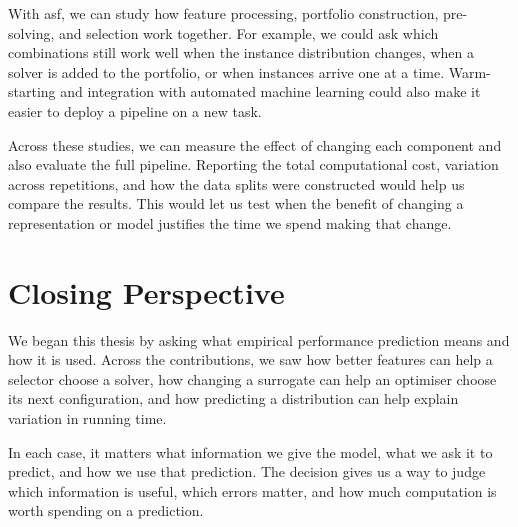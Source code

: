 With \gls{asf}, we can study how feature processing, portfolio construction, pre-solving, and selection work together. For example, we could ask which combinations still work well when the instance distribution changes, when a solver is added to the portfolio, or when instances arrive one at a time. Warm-starting and integration with automated machine learning could also make it easier to deploy a pipeline on a new task.

Across these studies, we can measure the effect of changing each component and also evaluate the full pipeline. Reporting the total computational cost, variation across repetitions, and how the data splits were constructed would help us compare the results. This would let us test when the benefit of changing a representation or model justifies the time we spend making that change.

\section{Closing Perspective}
\label{sec:ch12:closing}

We began this thesis by asking what empirical performance prediction means and how it is used. Across the contributions, we saw how better features can help a selector choose a solver, how changing a surrogate can help an optimiser choose its next configuration, and how predicting a distribution can help explain variation in running time.

In each case, it matters what information we give the model, what we ask it to predict, and how we use that prediction. The decision gives us a way to judge which information is useful, which errors matter, and how much computation is worth spending on a prediction.
